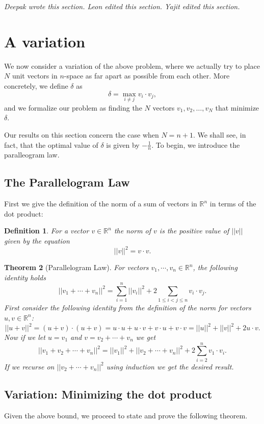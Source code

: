 \documentclass[11pt,letterpaper,twoside,english]{article}
\theoremstyle{theorem}
\newtheorem{theorem}{Theorem}[section]
\newtheorem{definition}[theorem]{Definition}
\theoremstyle{remark}
\providecommand{\R}{\mathbb{R}}
\begin{document}
{\itshape Deepak wrote this section. Leon edited this section. Yajit edited this section.}


\section{A variation}

We now consider a variation of the above problem, where we actually try to place $N$ unit vectors in $n$-space as far apart as possible from each other. More concretely, we define $\delta$ as
$$\delta = \max_{i \neq j} v_i \cdot v_j,$$
and we formalize our problem as finding the $N$ vectors $v_1, v_2, \ldots, v_N$ that minimize $\delta$.

Our results on this section concern the case when $N=n+1$. We shall see, in fact, that the optimal value of $\delta$ is given by $-\frac{1}{n}$. To begin, we introduce the paralleogram law.

\subsection{The Parallelogram Law}

First we give the definition of the norm of a sum of vectors in $\R^n$ in terms of the dot product:

\begin{definition}
For a vector $v\in\R^n$ the norm of $v$ is the positive value of $||v||$ given by the equation
$$
||v||^2=v\cdot v.
$$
\end{definition}
\begin{theorem}[Parallelogram Law]
For vectors $v_1,\cdots,v_n\in\R^n$, the following identity holds
$$
||v_1+\cdots+v_n||^2=\displaystyle\sum_{i=1}^n||v_i||^2+2\displaystyle\sum_{1\le i<j\le n}v_i\cdot v_j.
$$
\proof
First consider the following identity from the definition of the norm for vectors $u,v\in\R^n$:
$$
||u+v||^2=(u+v)\cdot (u+v)=u\cdot u+u\cdot v+ v\cdot u + v\cdot v=||u||^2+||v||^2+2u\cdot v.
$$
Now if we let $u=v_1$ and $v= v_2+\cdots+v_n$ we get 
$$
||v_1+v_2+\cdots+v_n||^2=||v_1||^2+||v_2+\cdots +v_n||^2+2\sum_{i=2}^n v_1\cdot v_i.
$$
If we recurse on $||v_2+\cdots +v_n||^2$ using induction we get the desired result. 
\end{theorem}


\subsection{Variation: Minimizing the dot product}
Given the above bound, we proceed to state and prove the following theorem.
\end{document}
